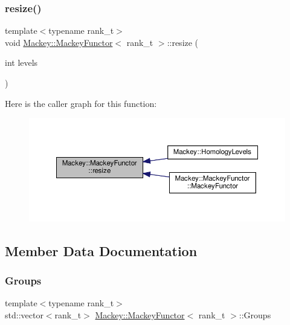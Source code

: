 \subsubsection{\texorpdfstring{resize()}{resize()}}
{\footnotesize\ttfamily template$<$typename rank\+\_\+t$>$ \\
void \hyperlink{classMackey_1_1MackeyFunctor}{Mackey\+::\+Mackey\+Functor}$<$ rank\+\_\+t $>$\+::resize (\begin{DoxyParamCaption}\item[{int}]{levels }\end{DoxyParamCaption})\hspace{0.3cm}{\ttfamily [inline]}}

Here is the caller graph for this function\+:\nopagebreak
\begin{figure}[H]
\begin{center}
\leavevmode
\includegraphics[width=350pt]{classMackey_1_1MackeyFunctor_a44d3104a47f23de5d8141b7800db6d11_icgraph}
\end{center}
\end{figure}


\subsection{Member Data Documentation}
\mbox{\label{classMackey_1_1MackeyFunctor_a4f8f5f7ac6267bdee2a67c8874bdd9a3}} 
\subsubsection{\texorpdfstring{Groups}{Groups}}
{\footnotesize\ttfamily template$<$typename rank\+\_\+t$>$ \\
std\+::vector$<$rank\+\_\+t$>$ \hyperlink{classMackey_1_1MackeyFunctor}{Mackey\+::\+Mackey\+Functor}$<$ rank\+\_\+t $>$\+::Groups}



